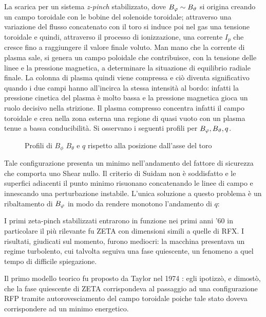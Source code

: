 La scarica per un sistema \emph{z-pinch} stabilizzato, dove $B_\varphi \sim
B_\vartheta$ si origina creando un campo toroidale con le bobine del solenoide
toroidale; attraverso una variazione del flusso concatenato con il toro
si induce poi nel gas una tensione toroidale e quindi, attraverso il
processo di ionizzazione, una corrente $I_p$ che cresce fino a
raggiungere il valore finale voluto. Man mano che la corrente di plasma
sale, si genera un campo poloidale che contribuisce, con la tensione
delle linee e la pressione magnetica, a determinare la situazione di
equilibrio radiale finale. La colonna di plasma quindi viene compressa e
ciò diventa significativo quando i due campi hanno all'incirca la stessa
intensità al bordo: infatti la pressione cinetica del plasma è molto
bassa e la pressione magnetica gioca un ruolo decisivo nella strizione.
Il plasma compresso concentra infatti il campo toroidale e crea nella
zona esterna una regione di quasi vuoto con un plasma tenue a bassa
conducibilità. Si osservano i seguenti profili per $B_\varphi , B_\vartheta ,q$.

\begin{figure}[ht]
 \centering
  \caption{Profili di $B_\phi$ $B_\theta$ e $q$ rispetto alla posizione dall'asse del toro}
\end{figure}

Tale configurazione presenta un minimo nell'andamento del fattore di
sicurezza che comporta uno Shear nullo. Il criterio di Suidam non è
soddisfatto e le superfici adiacenti il punto minimo risuonano
concatenando le linee di campo e innescando una perturbazione instabile.
L'unica soluzione a questo problema è un ribaltamento di $B_\varphi$ in modo
da rendere monotono l'andamento di $q$:

I primi zeta-pinch stabilizzati entrarono in funzione nei primi anni '60
in particolare il più rilevante fu ZETA con dimensioni simili a quelle
di RFX. I risultati, giudicati sul momento, furono mediocri: la macchina
presentava un regime turbolento, cui talvolta seguiva una fase
quiescente, un fenomeno a quel tempo di difficile spiegazione.

Il primo modello teorico fu proposto da Taylor nel 1974 \cite{taylor}:
egli ipotizzò, e dimostò, che la fase quiescente di ZETA corrispondeva
al passaggio ad una configurazione RFP tramite autorovesciamento del
campo toroidale poiche tale stato doveva corrispondere ad un minimo
energetico.

